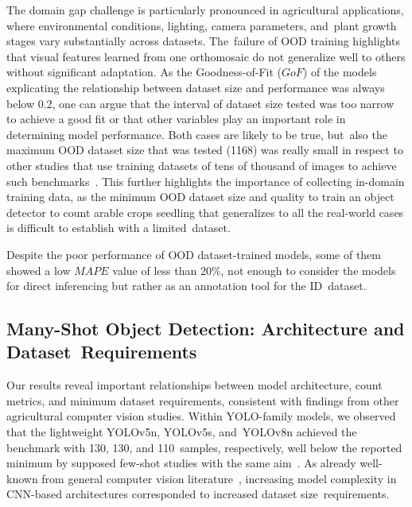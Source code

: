 \documentclass[12pt,a4paper,oneside]{report}
\begin{document}
The domain gap challenge is particularly pronounced in agricultural applications, 
where environmental conditions, lighting, camera parameters, and~plant growth stages 
vary substantially across datasets. The~failure of OOD training highlights that visual 
features learned from one orthomosaic do not generalize well to others without 
significant adaptation. 
As the Goodness-of-Fit ($GoF$) of the models explicating the relationship between dataset size and performance
was always below 0.2, one can argue that the interval of dataset size tested was too narrow
to achieve a good fit or that other variables play an important role in determining model performance.
Both cases are likely to be true, but~also the maximum OOD dataset size that
was tested (1168) was really small in respect to other studies that use training 
datasets of tens of thousand of images to achieve such benchmarks~\cite{badgujarAgriculturalObjectDetection2024}.
This further highlights the importance of collecting in-domain training data, 
as the minimum OOD dataset size and quality to train an object detector to
count arable crops seedling that generalizes to all the real-world cases
is difficult to establish with a limited~dataset. 

Despite the poor performance of OOD dataset-trained models, some of them showed a low $MAPE$ value of less than 20\%,
not enough to consider the models for direct inferencing but rather as an annotation
tool for the ID~dataset.

\subsection{Many-Shot Object Detection: Architecture and Dataset~Requirements}
Our results reveal important relationships between model architecture, count metrics, 
and minimum dataset requirements, consistent with findings from other agricultural computer vision studies. 
Within YOLO-family models, we observed that the lightweight YOLOv5n, YOLOv5s, and~YOLOv8n achieved 
the benchmark with 130, 130, and 110~samples, respectively, well below the  
reported minimum by supposed few-shot studies with the same aim~\cite{karamiAutomaticPlantCounting2020}. 
As already well-known from general computer vision literature~\cite{nguyenEvaluationDeepLearning2020,sunRevisitingUnreasonableEffectiveness2017}, increasing model 
complexity in CNN-based architectures corresponded to increased dataset size~requirements.
\end{document}
